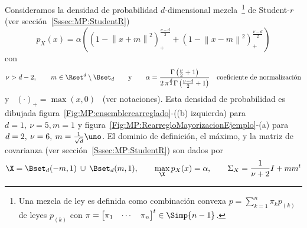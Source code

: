 {\begin{ejemplo}\label{Ej:MP:Rearreglo}
  Consideramos la densidad  de probabilidad $d$-dimensional mezcla~\footnote{Una
    mezcla  de ley  es definida  como  combinaci\'on convexa  $p =  \sum_{k=1}^n
    \pi_k p_{(k)}$ de leyes  $p_{(k)}$ con $\pi = \protect\begin{bmatrix} \pi_1
      &   \cdots  &  \pi_n   \end{bmatrix}^t\protect  \in   \Simp{n-1}$.}  de
  Student-$r$ (ver secci\'on~\ref{Sssec:MP:StudentR})
  \[
  p_X(x)   =   \alpha   \left(  \left(   1   -   \left\|   x  +   m   \right\|^2
    \right)_+^{\frac{\nu-d}{2}} + \left(  1 - \left\| x - m
      \right\|^2 \right)_+^{\frac{\nu-d}{2}} \right)
  \]
  con
  \[
  \nu  > d-2,  \qquad m  \in \Rset^d  \setminus \Bset_d  \qquad  \mbox{y} \qquad
  \alpha = \frac{\Gamma\left( \frac{\nu}{2}  + 1 \right)}{2 \, \pi^{\frac{d}{2}}
    \Gamma\left(  \frac{\nu-d}{2}  +   1  \right)}  \quad  \mbox{coeficiente  de
    normalizaci\'on}
  \]
  y \ $(\cdot)_+ = \max(x,0)$ \ (ver notaciones).  Esta densidad de probabilidad
  es dibujada figura~\ref{Fig:MP:ensemblerearreglado}-((b)  izquierda) para $d =
  1, \:  \nu = 5, m =  1$ y figura~\ref{Fig:MP:RearregloMayorizacionEjemplo}-(a)
  para  $d = 2,  \: \nu  = 6,  \: m  = \frac{1}{\sqrt{d}}  \uno$.  El  dominio de
  definici\'on,    el   m\'aximo,    y    la   matriz    de   covarianza    (ver
  secci\'on~\ref{Sssec:MP:StudentR}) son dados por
  \[
  \X =  \Bset_d(-m,1) \: \cup \:  \Bset_d(m,1), \qquad \max_\X  p_X(x) = \alpha,
  \qquad \Sigma_X = \frac{1}{\nu+2} I + m m^t
  \]


\end{ejemplo}}
